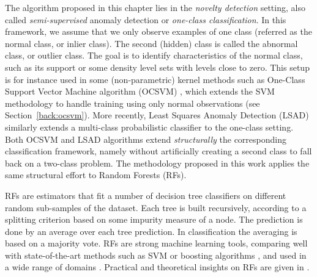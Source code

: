 The algorithm proposed in this chapter lies in the \emph{novelty detection}
setting, also called \emph{semi-supervised} anomaly detection or
\emph{one-class classification}. In this framework, we assume that we only observe examples of one
class (referred as the normal class, or inlier class). The second (hidden) class is called the abnormal class, or outlier class. 
The goal is to identify characteristics of the normal class, such as its
support or some density level sets with levels close to zero.
%
This setup is for instance used in some (non-parametric) kernel methods such as
One-Class Support Vector Machine algorithm (OCSVM) \citep{Scholkopf2001}, which extends
the SVM methodology \citep{Cortes1995,Shawe2004} to handle training using only normal observations (see Section~\ref{back:ocsvm}).
More recently, Least Squares Anomaly Detection (LSAD) \citep{Quinn2014} similarly extends a multi-class probabilistic classifier \citep{Sugiyama2010} to the one-class setting.
%
Both OCSVM and LSAD algorithms extend \emph{structurally} the corresponding classification
framework, namely without artificially creating a second class to
fall back on a two-class problem. %
The methodology proposed in this work applies the same structural effort to
Random Forests (RFs).


RFs \citep{Breiman2001} are estimators that fit a number of decision tree
classifiers on different random sub-samples of the dataset.
Each tree is built recursively, according to a splitting criterion based on
some impurity measure of a node.
The prediction is done by an average over each tree prediction.
In classification the averaging is based on a majority vote. %
RFs are strong machine learning tools, comparing well with state-of-the-art
methods such as SVM or boosting algorithms \citep{Freund1996}, and used in
a wide range of domains \citep{Svetnik2003, Diaz2006, Genuer2010}. Practical and
theoretical insights on RFs are given in \cite{Genuer2008, Biau2008, Louppe2014, Biau2016}.


